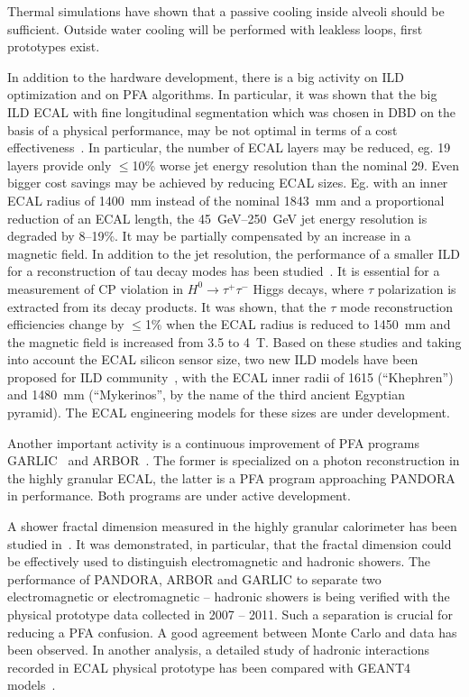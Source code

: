 Thermal simulations have shown that a passive cooling inside alveoli should be
sufficient. Outside water cooling will be performed with leakless loops, first
prototypes exist.

In addition to the hardware development, there is a big activity on ILD
optimization and on PFA algorithms. In particular, it was shown that the big
ILD ECAL with fine longitudinal segmentation which was chosen in DBD on the
basis of a physical performance, may be not optimal in terms of a cost
effectiveness~\cite{Tran:2014hma,MarshallPandoraSiW:2013}. In particular, the number of ECAL layers may be
reduced, eg. 19 layers provide only $\le$10\% worse jet energy resolution than
the nominal 29. Even bigger cost savings may be achieved by reducing ECAL
sizes. Eg. with an inner ECAL radius of \SI{1400}{mm} instead of the nominal \SI{1843}{mm}
and a proportional reduction of an ECAL length, the \SIrange{45}{250}{GeV} jet energy
resolution is degraded by 8--19\%. It may be partially compensated by an
increase in a magnetic field. In addition to the jet resolution, the
performance of a smaller ILD for a reconstruction of tau decay modes has been
studied~\cite{SueharaTauRecoALCW2015}. It is essential for a measurement of CP violation in
$H^0\to \tau^+\tau^-$ Higgs decays, where $\tau$ polarization is extracted
from its decay products. It was shown, that the $\tau$ mode reconstruction
efficiencies change by $\le$1\% when the ECAL radius is reduced to \SI{1450}{mm} and
the magnetic field is increased from 3.5 to \SI{4}{T}. Based on these studies and
taking into account the ECAL silicon sensor size, two new ILD models have been
proposed for ILD community~\cite{VideauALCW2015}, with the ECAL inner radii of
1615 (``Khephren'') and \SI{1480}{mm} (``Mykerinos'', by the name of the third
ancient Egyptian pyramid). The ECAL engineering models for these sizes are
under development.

Another important activity is a continuous improvement of PFA programs
GARLIC~\cite{2012JInst...7.6003J} and ARBOR~\cite{Ruan:2014paa}. The former is specialized on a
photon reconstruction in the highly granular ECAL, the latter is a PFA program
approaching PANDORA~\cite{Thomson200925} in performance. Both programs are under
active development.

A shower fractal dimension measured in the highly granular calorimeter has
been studied in~\cite{Ruan:2013iaa}. It was demonstrated, in particular, that the
fractal dimension could be effectively used to distinguish electromagnetic and
hadronic showers. The performance of PANDORA, ARBOR and GARLIC to separate two
electromagnetic or electromagnetic -- hadronic showers is being verified with
the physical prototype data collected in 2007 -- 2011. Such a separation is
crucial for reducing a PFA confusion. A good agreement between Monte Carlo and
data has been observed. In another analysis, a detailed study of hadronic
interactions recorded in ECAL physical prototype has been compared with GEANT4
models~\cite{Bilki2015240}.

